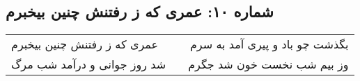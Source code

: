 \begin{center}
\section*{شماره ۱۰: عمری که ز رفتنش چنین بیخبرم}
\label{sec:010}
\begin{longtable}{l p{0.5cm} r}
عمری که ز رفتنش چنین بیخبرم
&&
بگذشت چو باد و پیری آمد به سرم
\\
شد روز جوانی و درآمد شب مرگ
&&
وز بیم شب نخست خون شد جگرم
\\
\end{longtable}
\end{center}
